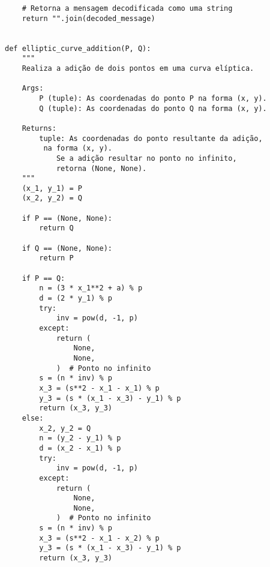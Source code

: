 \begin{verbatim}
    # Retorna a mensagem decodificada como uma string
    return "".join(decoded_message)


def elliptic_curve_addition(P, Q):
    """
    Realiza a adição de dois pontos em uma curva elíptica.

    Args:
        P (tuple): As coordenadas do ponto P na forma (x, y).
        Q (tuple): As coordenadas do ponto Q na forma (x, y).

    Returns:
        tuple: As coordenadas do ponto resultante da adição,
         na forma (x, y).
            Se a adição resultar no ponto no infinito,
            retorna (None, None).
    """
    (x_1, y_1) = P
    (x_2, y_2) = Q

    if P == (None, None):
        return Q

    if Q == (None, None):
        return P

    if P == Q:
        n = (3 * x_1**2 + a) % p
        d = (2 * y_1) % p
        try:
            inv = pow(d, -1, p)
        except:
            return (
                None,
                None,
            )  # Ponto no infinito
        s = (n * inv) % p
        x_3 = (s**2 - x_1 - x_1) % p
        y_3 = (s * (x_1 - x_3) - y_1) % p
        return (x_3, y_3)
    else:
        x_2, y_2 = Q
        n = (y_2 - y_1) % p
        d = (x_2 - x_1) % p
        try:
            inv = pow(d, -1, p)
        except:
            return (
                None,
                None,
            )  # Ponto no infinito
        s = (n * inv) % p
        x_3 = (s**2 - x_1 - x_2) % p
        y_3 = (s * (x_1 - x_3) - y_1) % p
        return (x_3, y_3)
\end{verbatim}

